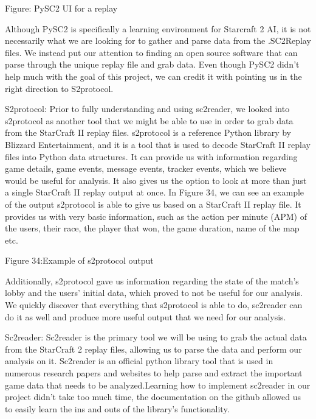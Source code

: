 \documentclass[a4paper,12pt]{report}
\begin{document}
 
Figure: PySC2 UI for a replay

Although PySC2 is specifically a learning environment for Starcraft 2 AI, it is not necessarily what we are looking for to gather and parse data from the .SC2Replay files. We instead put our attention to finding an open source software that can parse through the unique replay file and grab data. Even though PySC2 didn’t help much with the goal of this project, we can credit it with pointing us in the right direction to S2protocol.

S2protocol:
Prior to fully understanding and using sc2reader, we looked into s2protocol as another tool that we might be able to use in order to grab data from the StarCraft II replay files. s2protocol is a reference Python library by Blizzard Entertainment, and it is a tool that is used to decode StarCraft II replay files into Python data structures. It can provide us with information regarding game details, game events, message events, tracker events, which we believe would be useful for analysis. It also gives us the option to look at more than just a single StarCraft II replay output at once. In Figure 34, we can see an example of the output s2protocol is able to give us based on a StarCraft II replay file. It provides us with very basic information, such as the action per minute (APM) of the users, their race, the player that won, the game duration, name of the map etc.


Figure 34:Example of s2protocol output

Additionally, s2protocol gave us information regarding the state of the match’s lobby and the users’ initial data, which proved to not be useful for our analysis. We quickly discover that everything that s2protocol is able to do, sc2reader can do it as well and produce more useful output that we need for our analysis. 

Sc2reader:
Sc2reader is the primary tool we will be using to grab the actual data from the StarCraft 2 replay files, allowing us to parse the data and perform our analysis on it. Sc2reader is an official python library tool that is used in numerous research papers and websites to help parse and extract the important game data that needs to be analyzed.Learning how to implement sc2reader in our project didn’t take too much time, the documentation on the github allowed us to easily learn the ins and outs of the library's functionality.
\end{document}
